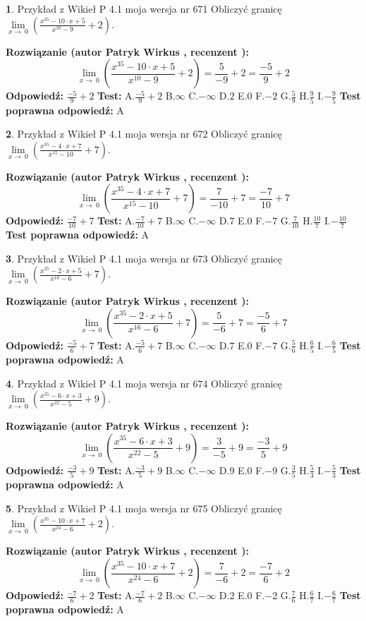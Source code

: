 \documentclass[12pt, a4paper]{article}
\theoremstyle{definition} %
\newtheorem{zad}{}
\newcommand{\zadStart}[1]{\begin{zad}#1\newline}
\newcommand{\zadStop}{\end{zad}}
\newcommand{\rozwStart}[2]{\noindent \textbf{Rozwiązanie (autor #1 , recenzent #2): }\newline}
\newcommand{\rozwStop}{\newline}
\newcommand{\odpStart}{\noindent \textbf{Odpowiedź:}\newline}
\newcommand{\odpStop}{\newline}
\newcommand{\testStart}{\noindent \textbf{Test:}\newline}
\newcommand{\testStop}{\newline}
\newcommand{\kluczStart}{\noindent \textbf{Test poprawna odpowiedź:}\newline}
\newcommand{\kluczStop}{\newline}
\begin{document}
\zadStart{Przykład z Wikieł P 4.1 moja wersja nr 671}
Obliczyć granicę $\lim\limits_{x\to\ 0}(\frac{x^{35}-10 \cdot x +5}{x^{10}-9}+2)$.
\zadStop
\rozwStart{Patryk Wirkus}{}
$$\lim\limits_{x\to\ 0}(\frac{x^{35}-10 \cdot x +5}{x^{10}-9}+2)=\frac{5}{-9}+2=\frac{-5}{9}+2$$
\rozwStop
\odpStart
$\frac{-5}{9}+2$
\odpStop
\testStart
A.$\frac{-5}{9}+2$
B.$\infty$
C.$-\infty$
D.$2$
E.$0$
F.$-2$
G.$\frac{5}{9}$
H.$\frac{9}{5}$
I.$-\frac{9}{5}$
\testStop
\kluczStart
A
\kluczStop



\zadStart{Przykład z Wikieł P 4.1 moja wersja nr 672}
Obliczyć granicę $\lim\limits_{x\to\ 0}(\frac{x^{35}-4 \cdot x +7}{x^{15}-10}+7)$.
\zadStop
\rozwStart{Patryk Wirkus}{}
$$\lim\limits_{x\to\ 0}(\frac{x^{35}-4 \cdot x +7}{x^{15}-10}+7)=\frac{7}{-10}+7=\frac{-7}{10}+7$$
\rozwStop
\odpStart
$\frac{-7}{10}+7$
\odpStop
\testStart
A.$\frac{-7}{10}+7$
B.$\infty$
C.$-\infty$
D.$7$
E.$0$
F.$-7$
G.$\frac{7}{10}$
H.$\frac{10}{7}$
I.$-\frac{10}{7}$
\testStop
\kluczStart
A
\kluczStop



\zadStart{Przykład z Wikieł P 4.1 moja wersja nr 673}
Obliczyć granicę $\lim\limits_{x\to\ 0}(\frac{x^{35}-2 \cdot x +5}{x^{16}-6}+7)$.
\zadStop
\rozwStart{Patryk Wirkus}{}
$$\lim\limits_{x\to\ 0}(\frac{x^{35}-2 \cdot x +5}{x^{16}-6}+7)=\frac{5}{-6}+7=\frac{-5}{6}+7$$
\rozwStop
\odpStart
$\frac{-5}{6}+7$
\odpStop
\testStart
A.$\frac{-5}{6}+7$
B.$\infty$
C.$-\infty$
D.$7$
E.$0$
F.$-7$
G.$\frac{5}{6}$
H.$\frac{6}{5}$
I.$-\frac{6}{5}$
\testStop
\kluczStart
A
\kluczStop



\zadStart{Przykład z Wikieł P 4.1 moja wersja nr 674}
Obliczyć granicę $\lim\limits_{x\to\ 0}(\frac{x^{35}-6 \cdot x +3}{x^{22}-5}+9)$.
\zadStop
\rozwStart{Patryk Wirkus}{}
$$\lim\limits_{x\to\ 0}(\frac{x^{35}-6 \cdot x +3}{x^{22}-5}+9)=\frac{3}{-5}+9=\frac{-3}{5}+9$$
\rozwStop
\odpStart
$\frac{-3}{5}+9$
\odpStop
\testStart
A.$\frac{-3}{5}+9$
B.$\infty$
C.$-\infty$
D.$9$
E.$0$
F.$-9$
G.$\frac{3}{5}$
H.$\frac{5}{3}$
I.$-\frac{5}{3}$
\testStop
\kluczStart
A
\kluczStop



\zadStart{Przykład z Wikieł P 4.1 moja wersja nr 675}
Obliczyć granicę $\lim\limits_{x\to\ 0}(\frac{x^{35}-10 \cdot x +7}{x^{24}-6}+2)$.
\zadStop
\rozwStart{Patryk Wirkus}{}
$$\lim\limits_{x\to\ 0}(\frac{x^{35}-10 \cdot x +7}{x^{24}-6}+2)=\frac{7}{-6}+2=\frac{-7}{6}+2$$
\rozwStop
\odpStart
$\frac{-7}{6}+2$
\odpStop
\testStart
A.$\frac{-7}{6}+2$
B.$\infty$
C.$-\infty$
D.$2$
E.$0$
F.$-2$
G.$\frac{7}{6}$
H.$\frac{6}{7}$
I.$-\frac{6}{7}$
\testStop
\kluczStart
A
\kluczStop
\end{document}
